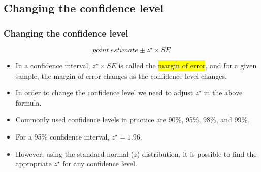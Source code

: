
\subsection{Changing the confidence level}


\begin{frame}
\frametitle{Changing the confidence level}

\[ point~estimate\pm z^\star \times SE \] 

\begin{itemize}

\item In a confidence interval, $z^\star \times SE$ is called the \hl{margin of error}, and for a given sample, the margin of error changes as the confidence level changes.

\item In order to change the confidence level we need to adjust $z^\star$ in the above formula.

\item Commonly used confidence levels in practice are 90\%, 95\%, 98\%, and 99\%.

\item For a 95\% confidence interval, $z^\star = 1.96$.

\item However, using the standard normal ($z$) distribution, it is possible to find the appropriate $z^\star$ for any confidence level.

\end{itemize}

\end{frame}


